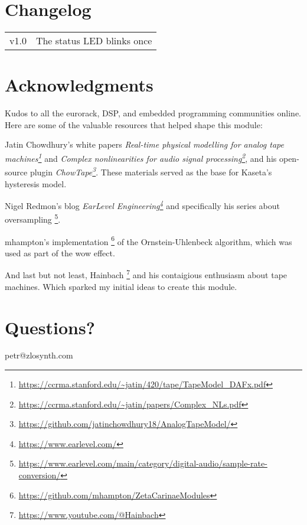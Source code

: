 \documentclass[11pt]{article}
\begin{document}
\noindent
\begin{minipage}[t]{0.3\textwidth}
\section{Changelog}

\begin{tabular}{@{}rl@{}}
  v1.0 & The status LED blinks once
\end{tabular}

\end{minipage}%
\begin{minipage}{0.05\textwidth}
\phantom{ }
\end{minipage}%
\begin{minipage}[t]{0.3\textwidth}
\setlength{\parskip}{6pt}
\section{Acknowledgments}

Kudos to all the eurorack, DSP, and embedded programming communities online.
Here are some of the valuable resources that helped shape this module:

Jatin Chowdhury's white papers
\textit{Real-time physical modelling for analog tape machines\footnote{
  \url{https://ccrma.stanford.edu/~jatin/420/tape/TapeModel_DAFx.pdf}
}}
and
\textit{Complex nonlinearities for audio signal processing\footnote{
  \url{https://ccrma.stanford.edu/~jatin/papers/Complex_NLs.pdf}
}},
and his open-source plugin
\textit{ChowTape\footnote{
  \url{https://github.com/jatinchowdhury18/AnalogTapeModel/}
}}. These materials served as the base for Kaseta's hysteresis model.

Nigel Redmon's blog
\textit{EarLevel Engineering\footnote{
  \url{https://www.earlevel.com/}
}}
and specifically his series about oversampling%
\footnote{\url{https://www.earlevel.com/main/category/digital-audio/sample-rate-conversion/}}.

mhampton's implementation%
\footnote{\url{https://github.com/mhampton/ZetaCarinaeModules}}
of the Ornstein-Uhlenbeck algorithm, which was used as part of the wow effect.

And last but not least, Hainbach%
\footnote{\url{https://www.youtube.com/@Hainbach}}
and his contaigious enthusiasm about tape machines. Which sparked my initial
ideas to create this module.

\vspace{3cm}

\end{minipage}
\begin{minipage}{0.05\textwidth}
\phantom{ }
\end{minipage}%
\begin{minipage}[t]{0.3\textwidth}
\section{Questions?}

\begin{center}
petr@zlosynth.com
\end{center}
\end{minipage}
\end{document}
